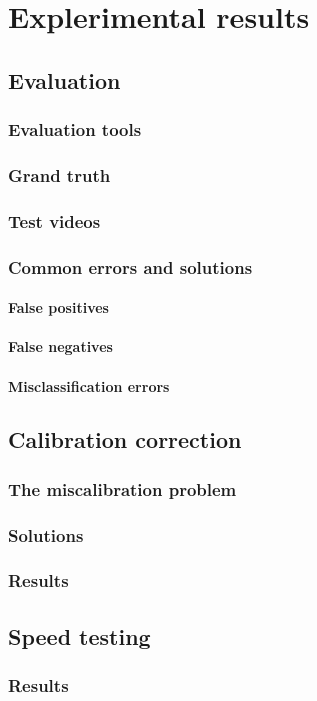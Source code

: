 \chapter{Explerimental results}\label{chap:Tests}
\section{Evaluation}

\subsection{Evaluation tools}
\subsection{Grand truth}
\subsection{Test videos}

\subsection{Common errors and solutions}
\subsubsection{False positives}
\subsubsection{False negatives}
\subsubsection{Misclassification errors}

\section{Calibration correction}

\subsection{The miscalibration problem}
\subsection{Solutions}
\subsection{Results}

\section{Speed testing}

\subsection{Results}
